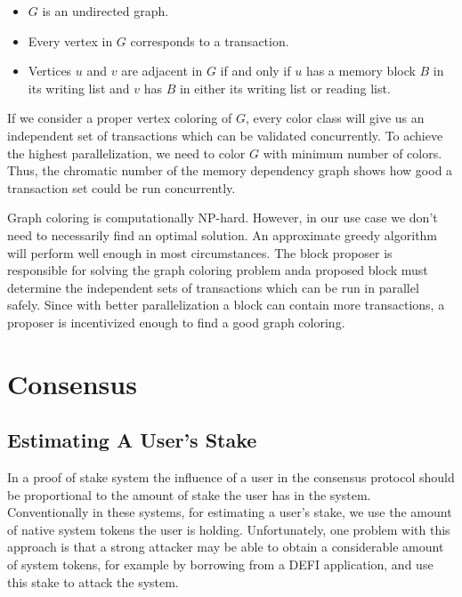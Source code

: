 \documentclass[11pt, A4]{report}
\begin{document}
    \begin{itemize}
        \item \(G\) is an undirected graph.
        \item Every vertex in \(G\) corresponds to a transaction.
        \item Vertices \(u\) and \(v\) are adjacent in \(G\) if and only if \(u\) has a memory block \(B\) in its
        writing list and \(v\) has \(B\) in either its writing list or reading list.
    \end{itemize}

    If we consider a proper vertex coloring of \(G\), every color class will give us an independent set of
    transactions which can be validated concurrently. To achieve the highest parallelization, we need to color \(G\)
    with minimum number of colors. Thus, the chromatic number of the memory dependency graph shows how good a
    transaction set could be run concurrently.

    Graph coloring is computationally NP-hard. However, in our use case we don't need to necessarily find an optimal
    solution. An approximate greedy algorithm will perform well enough in most circumstances. The block proposer is
    responsible for solving the graph coloring problem anda proposed block must determine the independent sets of
    transactions which can be run in parallel safely. Since with better parallelization a block can contain more
    transactions, a proposer is incentivized enough to find a good graph coloring.


    \section{Consensus}\label{sec:consensus}

    \subsection{Estimating A User's Stake}\label{subsec:estimating-a-user's-stake}

    In a proof of stake system the influence of a user in the consensus protocol should be proportional to the amount
    of stake the user has in the system. Conventionally in these systems, for estimating a user's stake, we use the
    amount of native system tokens the user is holding. Unfortunately, one problem with this approach is that a
    strong attacker may be able to obtain a considerable amount of system tokens, for example by borrowing from a
    DEFI application, and use this stake to attack the system.
\end{document}
